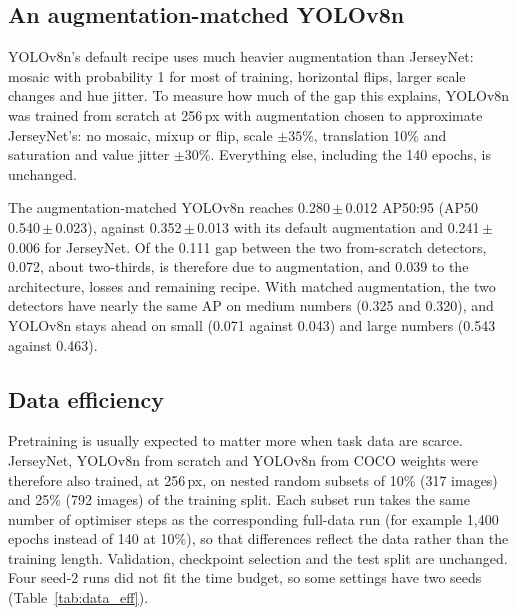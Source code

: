 \documentclass[10pt,a4paper]{article}
\newcommand{\pmv}[2]{#1\,$\pm$\,#2}
\begin{document}
\subsection{An augmentation-matched YOLOv8n}
\label{sec:augmatched}

YOLOv8n's default recipe uses much heavier augmentation than JerseyNet: mosaic with probability 1
for most of training, horizontal flips, larger scale changes and hue jitter. To measure how much of
the gap this explains, YOLOv8n was trained from scratch at 256\,px with augmentation chosen to
approximate JerseyNet's: no mosaic, mixup or flip, scale $\pm35\%$, translation 10\% and
saturation and value jitter $\pm30\%$. Everything else, including the 140 epochs, is unchanged.

The augmentation-matched YOLOv8n reaches \pmv{0.280}{0.012} AP50:95 (AP50 \pmv{0.540}{0.023}),
against \pmv{0.352}{0.013} with its default augmentation and \pmv{0.241}{0.006} for JerseyNet.
Of the 0.111 gap between the two from-scratch detectors, 0.072, about two-thirds, is therefore due
to augmentation, and 0.039 to the architecture, losses and remaining recipe. With matched
augmentation, the two detectors have nearly the same AP on medium numbers (0.325 and 0.320), and
YOLOv8n stays ahead on small (0.071 against 0.043) and large numbers (0.543 against 0.463).

\subsection{Data efficiency}
\label{sec:data}

Pretraining is usually expected to matter more when task data are scarce. JerseyNet, YOLOv8n from
scratch and YOLOv8n from COCO weights were therefore also trained, at 256\,px, on nested random
subsets of 10\% (317 images) and 25\% (792 images) of the training split. Each subset run takes the
same number of optimiser steps as the corresponding full-data run (for example 1,400 epochs instead
of 140 at 10\%), so that differences reflect the data rather than the training length. Validation,
checkpoint selection and the test split are unchanged. Four seed-2 runs did not fit the time budget,
so some settings have two seeds (Table~\ref{tab:data_eff}).
\end{document}
